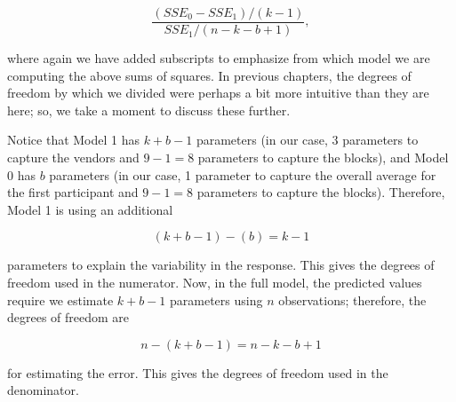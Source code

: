 \documentclass[
  letterpaper,
  DIV=11,
  numbers=noendperiod]{scrreprt}
\theoremstyle{plain}
\theoremstyle{definition}
\theoremstyle{definition}
\theoremstyle{remark}
\begin{document}
\[\frac{\left(SSE_0 - SSE_1\right)/(k - 1)}{SSE_1/(n - k - b + 1)},\]

where again we have added subscripts to emphasize from which model we
are computing the above sums of squares. In previous chapters, the
degrees of freedom by which we divided were perhaps a bit more intuitive
than they are here; so, we take a moment to discuss these further.

Notice that Model 1 has \(k + b - 1\) parameters (in our case, 3
parameters to capture the vendors and \(9 - 1 = 8\) parameters to
capture the blocks), and Model 0 has \(b\) parameters (in our case, 1
parameter to capture the overall average for the first participant and
\(9 - 1 = 8\) parameters to capture the blocks). Therefore, Model 1 is
using an additional

\[(k + b - 1) - (b) = k - 1\]

parameters to explain the variability in the response. This gives the
degrees of freedom used in the numerator. Now, in the full model, the
predicted values require we estimate \(k + b - 1\) parameters using
\(n\) observations; therefore, the degrees of freedom are

\[n - (k + b - 1) = n - k - b + 1\]

for estimating the error. This gives the degrees of freedom used in the
denominator.
\end{document}
